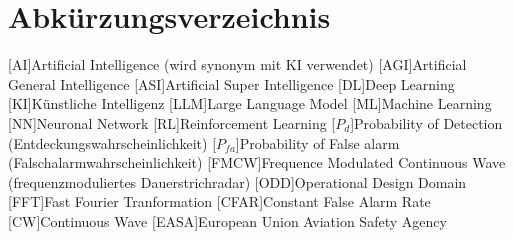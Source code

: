 \thispagestyle{empty}

\def\arp{\ac{ARP}\xspace}

\chapter*{Abkürzungsverzeichnis}\label{cha:Abkürzungsverzeichnis}

\begin{acronym}[SPACEBETWEEN]\itemsep3pt


    [AI]{Artificial Intelligence (wird synonym mit KI verwendet)}
    [AGI]{Artificial General Intelligence}
    [ASI]{Artificial Super Intelligence}
    [DL]{Deep Learning}
    [KI]{Künstliche Intelligenz}
    [LLM]{Large Language Model}
    [ML]{Machine Learning}
    [NN]{Neuronal Network}
    [RL]{Reinforcement Learning}
    [$P_d$]{Probability of Detection (Entdeckungswahrscheinlichkeit)}
    [$P_{fa}$]{Probability of False alarm (Falschalarmwahrscheinlichkeit)}
    [FMCW]{Frequence Modulated Continuous Wave (frequenzmoduliertes Dauerstrichradar)}
    [ODD]{Operational Design Domain}
    [FFT]{Fast Fourier Tranformation}
    [CFAR]{Constant False Alarm Rate}
    [CW]{Continuous Wave}
    [EASA]{European Union Aviation Safety Agency}




    
\end{acronym}
\newpage
